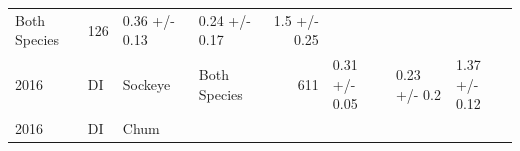\documentclass[fleqn,10pt]{wlpeerj} %
\begin{document}
\begin{longtable}[]{@{}llllrlll@{}}
\begin{minipage}[t]{0.11\columnwidth}
Both Species\strut
\end{minipage} & \begin{minipage}[t]{0.04\columnwidth}\raggedleft\strut
126\strut
\end{minipage} & \begin{minipage}[t]{0.14\columnwidth}\raggedright\strut
0.36 +/- 0.13\strut
\end{minipage} & \begin{minipage}[t]{0.14\columnwidth}\raggedright\strut
0.24 +/- 0.17\strut
\end{minipage} & \begin{minipage}[t]{0.14\columnwidth}\raggedright\strut
1.5 +/- 0.25\strut
\end{minipage}\tabularnewline
\begin{minipage}[t]{0.09\columnwidth}\raggedright\strut
2016\strut
\end{minipage} & \begin{minipage}[t]{0.06\columnwidth}\raggedright\strut
DI\strut
\end{minipage} & \begin{minipage}[t]{0.06\columnwidth}\raggedright\strut
Sockeye\strut
\end{minipage} & \begin{minipage}[t]{0.11\columnwidth}\raggedright\strut
Both Species\strut
\end{minipage} & \begin{minipage}[t]{0.04\columnwidth}\raggedleft\strut
611\strut
\end{minipage} & \begin{minipage}[t]{0.14\columnwidth}\raggedright\strut
0.31 +/- 0.05\strut
\end{minipage} & \begin{minipage}[t]{0.14\columnwidth}\raggedright\strut
0.23 +/- 0.2\strut
\end{minipage} & \begin{minipage}[t]{0.14\columnwidth}\raggedright\strut
1.37 +/- 0.12\strut
\end{minipage}\tabularnewline
\begin{minipage}[t]{0.09\columnwidth}\raggedright\strut
2016\strut
\end{minipage} & \begin{minipage}[t]{0.06\columnwidth}\raggedright\strut
DI\strut
\end{minipage} & \begin{minipage}[t]{0.06\columnwidth}\raggedright\strut
Chum\strut
\end{minipage} & \begin{minipage}[t]{0.11\columnwidth}\raggedright\strut

\end{minipage}
\end{longtable}
\end{document}
